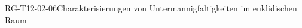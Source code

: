 
\begin{PROP}{RG-T12-02-06}{Charakterisierungen von Untermannigfaltigkeiten im euklidischen Raum}
\end{PROP}
